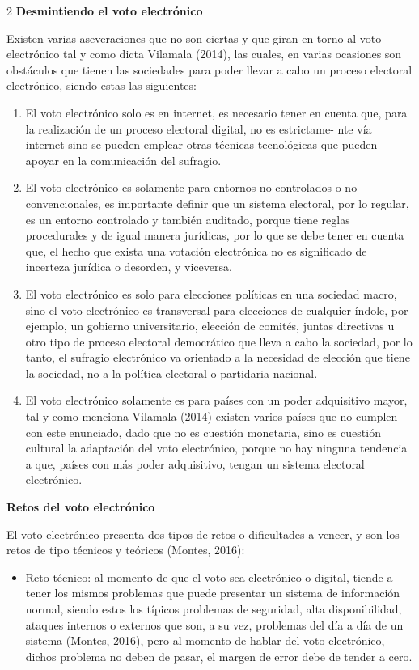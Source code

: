 \documentclass[12pt,spanish,Letterpaper,openany]{book}
\providecommand{\tightlist}{%
  \setlength{\itemsep}{0pt}\setlength{\parskip}{0pt}}
\begin{document}
\begin {multicols}{2}
\textbf{Desmintiendo el voto electrónico}

Existen varias aseveraciones que no son ciertas y que giran en torno al voto electrónico tal y como dicta Vilamala (2014), las cuales, en varias ocasiones son obstáculos que tienen las sociedades para poder llevar a cabo un proceso electoral electrónico, siendo estas las siguientes:

\begin{enumerate}
\def\labelenumi{\arabic{enumi}.}
\item
  El voto electrónico solo es en internet, es necesario tener en cuenta que, para la realización de un proceso electoral digital, no es estrictame-
  nte vía internet sino se pueden emplear otras técnicas tecnológicas que pueden apoyar en la comunicación del sufragio.
\item
  El voto electrónico es solamente para entornos no controlados o no convencionales, es importante definir que un sistema electoral, por lo regular, es un entorno controlado y también auditado, porque tiene reglas procedurales y de igual manera jurídicas, por lo que se debe tener en cuenta que, el hecho que exista una votación electrónica no es significado de incerteza jurídica o desorden, y viceversa.
\item
  El voto electrónico es solo para elecciones políticas en una sociedad macro, sino el voto electrónico es transversal para elecciones de cualquier índole, por ejemplo, un gobierno universitario, elección de comités, juntas directivas u otro tipo de proceso electoral democrático que lleva a cabo la sociedad, por lo tanto, el sufragio electrónico va orientado a la necesidad de elección que tiene la sociedad, no a la política electoral o partidaria nacional.
\item
  El voto electrónico solamente es para países con un poder adquisitivo mayor, tal y como menciona Vilamala (2014) existen varios países que no cumplen con este enunciado, dado que no es cuestión monetaria, sino es cuestión cultural la adaptación del voto electrónico, porque no hay ninguna tendencia a que, países con más poder adquisitivo, tengan un sistema electoral electrónico.
\end{enumerate}

\textbf{Retos del voto electrónico}

El voto electrónico presenta dos tipos de retos o dificultades a vencer, y son los retos de tipo técnicos y teóricos (Montes, 2016):

\begin{itemize}
\tightlist
\item
  Reto técnico: al momento de que el voto sea electrónico o digital, tiende a tener los mismos problemas que puede presentar un sistema de información normal, siendo estos los típicos problemas de seguridad, alta disponibilidad, ataques internos o externos que son, a su vez, problemas del día a día de un sistema (Montes, 2016), pero al momento de hablar del voto electrónico, dichos problema no deben de pasar, el margen de error debe de tender a cero.
\end{itemize}


\end{multicols}
\end{document}
